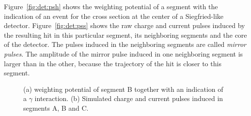 Figure~\ref{fig:det:psh} shows the weighting potential of a segment
with the indication of an event for the cross section at the center of
a Siegfried-like detector. Figure~\ref{fig:det:pss} shows the raw
charge and current pulses induced by the resulting hit in this
particular segment, its neighboring segments and the core of the
detector. The pulses induced in the neighboring segments are called
\emph{mirror pulses}. The amplitude of the mirror pulse induced in one
neighboring segment is larger than in the other, because the
trajectory of the hit is closer to this segment.
\begin{figure}[htbp] 
\centering 
{}%
% 
\caption{(a) weighting potential of segment B together with an
indication of a $\gamma$ interaction. (b) Simulated charge and current
pulses induced in segments A, B and C.}
\label{fig:pss:ps} 
\end{figure} 

